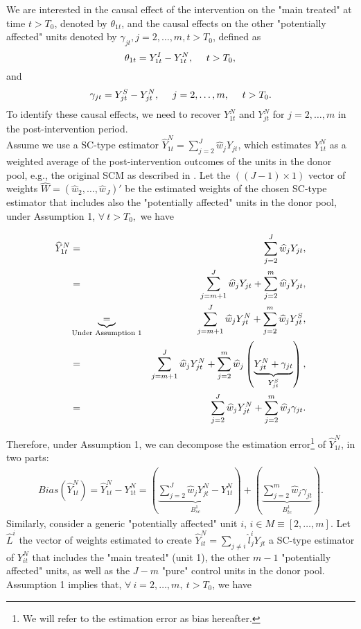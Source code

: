 We are interested in the causal effect of the intervention on the "main treated" at time $t>T_0$, denoted by $\theta_{1t}$, and the causal effects on the other "potentially affected" units denoted by $\gamma_{jt}, j=2,\ldots, m, t>T_0$, defined as
\begin{equation*}
\theta_{1t}=Y_{1t}^I- Y_{1t}^N,\ \ \ \  t>T_0,\\ 
\end{equation*}
and
\begin{equation*}
\gamma_{jt}=Y_{jt}^S- Y_{jt}^{N}, \ \ \ \ j=2,\ldots, m, \ \ \ \ t>T_0.\\
\end{equation*}
To identify these causal effects, we need to recover $Y_{1t}^N$ and $Y_{jt}^N$ for  $j=2, \dots, m$ in the post-intervention period.\\
Assume we use a SC-type estimator $\widehat{Y}_{1t}^N= \sum_{j=2}^J \widehat{w}_{j}Y_{jt}$, which estimates $Y_{1t}^N$ as a weighted average of the post-intervention outcomes of the units in the donor pool, e.g., the original SCM as described in \citet{Aba2010}. Let the $\left((J -1)\times 1\right)$ vector of weights $\widehat{W}=(\widehat{w}_{2}, \ldots , \widehat{w}_{J})'$ be the estimated weights of the chosen SC-type estimator that includes also the "potentially affected" units in the donor pool, under Assumption 1, $\forall \ t>T_0,$ we have

\begin{eqnarray}
\widehat{Y}_{1t}^N&=&\sum_{j=2}^J \widehat{w}_{j}Y_{jt}\notag,\\ &=&\sum_{j=m+1}^J \widehat{w}_{j}Y_{jt}+\sum_{j=2}^m \widehat{w}_{j}Y_{jt}\notag,\\
&\underbrace{=}_{\textrm{Under Assumption 1}}&  \sum_{j=m+1}^J \widehat{w}_{j}Y^N_{jt}+\sum_{j=2}^m \widehat{w}_{j}Y^S_{jt}\notag,\\
&=& \sum_{j=m+1}^J \widehat{w}_{j}Y^N_{jt}+\sum_{j=2}^m \widehat{w}_{j}\left(\underbrace{Y^N_{jt}+\gamma_{jt}}_{Y^S_{jt}}\right)\notag,\\
&=&\sum_{j=2}^J \widehat{w}_{j}Y^N_{jt}+\sum_{j=2}^m \widehat{w}_{j}{\gamma_{jt}}\notag.
\end{eqnarray}

Therefore, under Assumption 1, we can decompose the estimation error\footnote{We will refer to the estimation error as bias hereafter. } of $\widehat{Y}_{1t}^N$, in two parts:
\begin{eqnarray}
Bias\left(\widehat{Y}_{1t}^N\right)=\widehat{Y}_{1t}^N-Y^N_{1t}=\left(\underbrace{\sum_{j=2}^J \widehat{w}_{j}Y^N_{jt}-{Y}_{1t}^N}_{B^1_{sc}}\right)+\left( \underbrace{\sum_{j=2}^m \widehat{w}_{j}{\gamma_{jt}}}_{B^1_{te}}\right)\label{ynmt}.
\end{eqnarray}
Similarly, consider a generic "potentially affected" unit  $i$, $i \in M\equiv [2, \ldots, m]$. Let $\widehat{L}^{i}$ the vector of weights estimated to create $\widehat{Y}_{it}^N= \sum_{j\neq i} \widehat{l}_{j}^{i}Y_{jt}
$ a SC-type estimator of $Y_{it}^N$ that includes the "main treated" (unit 1), the other $m-1$ "potentially affected" units, as well as the $J-m$ "pure" control units in the donor pool. Assumption 1 implies that, $\forall \ i=2,\ldots,m, \ t>T_0$, we have

